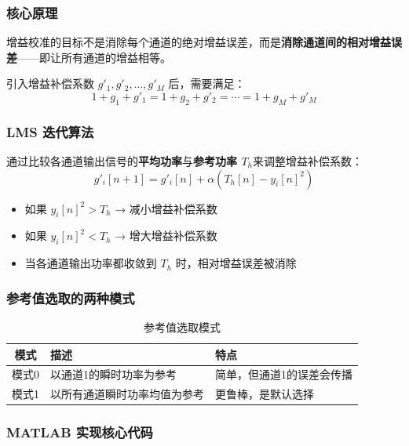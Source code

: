 \documentclass[UTF8,a4paper,11pt]{ctexart}
\begin{document}
\subsubsection{核心原理}

增益校准的目标不是消除每个通道的绝对增益误差，而是\textbf{消除通道间的相对增益误差}——即让所有通道的增益相等。

引入增益补偿系数 $g'_1, g'_2, \ldots, g'_{M}$ 后，需要满足：
\begin{equation}
    1 + g_1 + g'_1 = 1 + g_2 + g'_2 = \cdots = 1 + g_M + g'_M
\end{equation}

\subsubsection{LMS 迭代算法}

通过比较各通道输出信号的\textbf{平均功率}与\textbf{参考功率 $T_h$}来调整增益补偿系数：
\begin{equation}
    g'_i[n+1] = g'_i[n] + \alpha (T_h[n] - y_i[n]^2)
\end{equation}

\begin{itemize}
    \item 如果 $y_i[n]^2 > T_h$ → 减小增益补偿系数
    \item 如果 $y_i[n]^2 < T_h$ → 增大增益补偿系数
    \item 当各通道输出功率都收敛到 $T_h$ 时，相对增益误差被消除
\end{itemize}

\subsubsection{参考值选取的两种模式}

\begin{table}[ht]
\centering
\caption{参考值选取模式}
\begin{tabular}{cp{5cm}p{5cm}}
\toprule
\textbf{模式} & \textbf{描述} & \textbf{特点} \\
\midrule
模式0 & 以通道1的瞬时功率为参考 & 简单，但通道1的误差会传播 \\
模式1 & 以所有通道瞬时功率均值为参考 & 更鲁棒，是默认选择 \\
\bottomrule
\end{tabular}
\end{table}

\subsubsection{MATLAB 实现核心代码}
\end{document}

